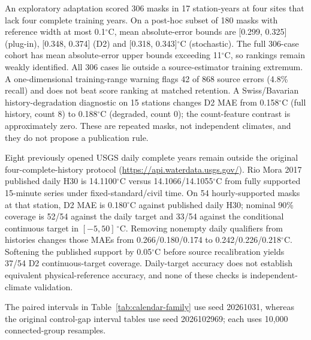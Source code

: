 \documentclass[draft,wrr]{agutexSI2019}
\begin{document}
\begin{article}
An exploratory adaptation scored 306 masks in 17 station-years at four sites that lack four complete training years. On a post-hoc subset of 180 masks with reference width at most 0.1$^{\circ}$C, mean absolute-error bounds are [0.299, 0.325] (plug-in), [0.348, 0.374] (D2) and [0.318, 0.343]$^{\circ}$C (stochastic). The full 306-case cohort has mean absolute-error upper bounds exceeding 11$^{\circ}$C, so rankings remain weakly identified. All 306 cases lie outside a source-estimator training extremum. A one-dimensional training-range warning flags 42 of 868 source errors (4.8\% recall) and does not beat score ranking at matched retention. A Swiss/Bavarian history-degradation diagnostic on 15 stations changes D2 MAE from 0.158$^{\circ}$C (full history, count 8) to 0.188$^{\circ}$C (degraded, count 0); the count-feature contrast is approximately zero. These are repeated masks, not independent climates, and they do not propose a publication rule.

Eight previously opened USGS daily complete years remain outside the original four-complete-history protocol (\url{https://api.waterdata.usgs.gov/}). Rio Mora 2017 published daily H30 is 14.1100$^{\circ}$C versus 14.1066/14.1055$^{\circ}$C from fully supported 15-minute series under fixed-standard/civil time. On 54 hourly-supported masks at that station, D2 MAE is 0.180$^{\circ}$C against published daily H30; nominal 90\% coverage is 52/54 against the daily target and 33/54 against the conditional continuous target in $[-5,50]\,^{\circ}$C. Removing nonempty daily qualifiers from histories changes those MAEs from 0.266/0.180/0.174 to 0.242/0.226/0.218$^{\circ}$C. Softening the published support by 0.05$^{\circ}$C before source recalibration yields 37/54 D2 continuous-target coverage. Daily-target accuracy does not establish equivalent physical-reference accuracy, and none of these checks is independent-climate validation.

\clearpage



The paired intervals in Table~\ref{tab:calendar-family} use seed 20261031, whereas the original control-gap interval tables use seed 2026102969; each uses 10,000 connected-group resamples.










\clearpage

\clearpage

\label{si:last-text-section}

\end{article}
\end{document}
